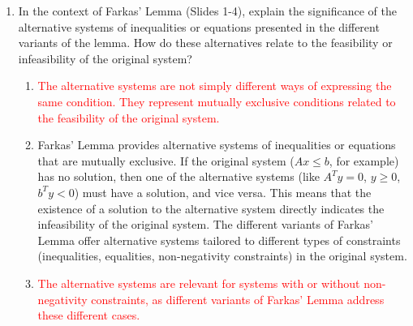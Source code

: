 \documentclass{article}%
\newcommand{\incorrect}[1]{\textcolor{red}{#1}}
\begin{document}
\begin{enumerate}
\begin{enumerate}
\item \incorrect{Rounding itself is not computationally expensive, but it is unreliable as a method for solving integer programming problems.}%
\item \incorrect{Rounding is applicable to problems with any number of integer variables, but it is unreliable as a method for solving integer programming problems.}%
\item Both (A) and (B) are true.  Rounding the solution of the linear programming relaxation can lead to two problems: (1) The rounded solution may be infeasible, meaning it violates one or more of the constraints of the original integer programming problem. (2) Even if the rounded solution is feasible, it may not be the optimal integer solution. The optimal integer solution could be significantly different from the rounded solution of the relaxed problem, leading to a suboptimal result.  Therefore, rounding is not a reliable method for solving integer programming problems.%
\end{enumerate}%
\vspace{1em}%
\item In the context of Farkas' Lemma (Slides 1-4), explain the significance of the alternative systems of inequalities or equations presented in the different variants of the lemma. How do these alternatives relate to the feasibility or infeasibility of the original system?%
\begin{enumerate}%
\item \incorrect{The alternative systems are not simply different ways of expressing the same condition. They represent mutually exclusive conditions related to the feasibility of the original system.}%
\item Farkas' Lemma provides alternative systems of inequalities or equations that are mutually exclusive.  If the original system ($Ax \le b$, for example) has no solution, then one of the alternative systems (like $A^T y = 0$, $y \ge 0$, $b^T y < 0$) must have a solution, and vice versa.  This means that the existence of a solution to the alternative system directly indicates the infeasibility of the original system.  The different variants of Farkas' Lemma offer alternative systems tailored to different types of constraints (inequalities, equalities, non-negativity constraints) in the original system.%
\item \incorrect{The alternative systems are relevant for systems with or without non-negativity constraints, as different variants of Farkas' Lemma address these different cases.}%

\end{enumerate}
\end{enumerate}
\end{document}
